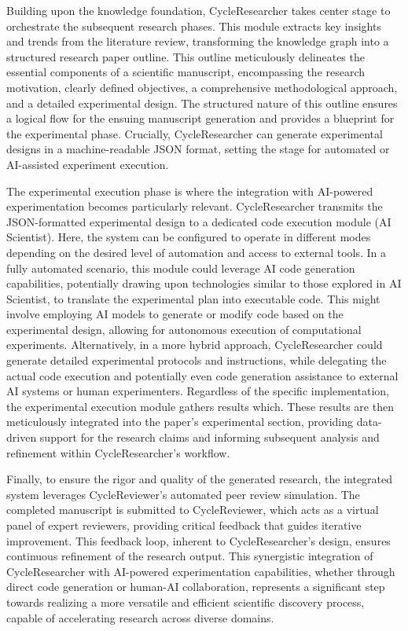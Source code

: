 \documentclass{article} %
\begin{document}
Building upon the knowledge foundation, CycleResearcher takes center stage to orchestrate the subsequent research phases. This module extracts key insights and trends from the literature review, transforming the knowledge graph into a structured research paper outline. This outline meticulously delineates the essential components of a scientific manuscript, encompassing the research motivation, clearly defined objectives, a comprehensive methodological approach, and a detailed experimental design. The structured nature of this outline ensures a logical flow for the ensuing manuscript generation and provides a blueprint for the experimental phase. Crucially, CycleResearcher can generate experimental designs in a machine-readable JSON format, setting the stage for automated or AI-assisted experiment execution.

The experimental execution phase is where the integration with AI-powered experimentation becomes particularly relevant. CycleResearcher transmits the JSON-formatted experimental design to a dedicated code execution module (AI Scientist). Here, the system can be configured to operate in different modes depending on the desired level of automation and access to external tools. In a fully automated scenario, this module could leverage AI code generation capabilities, potentially drawing upon technologies similar to those explored in AI Scientist, to translate the experimental plan into executable code. This might involve employing AI models to generate or modify code based on the experimental design, allowing for autonomous execution of computational experiments. Alternatively, in a more hybrid approach, CycleResearcher could generate detailed experimental protocols and instructions, while delegating the actual code execution and potentially even code generation assistance to external AI systems or human experimenters. Regardless of the specific implementation, the experimental execution module gathers results which. These results are then meticulously integrated into the paper's experimental section, providing data-driven support for the research claims and informing subsequent analysis and refinement within CycleResearcher's workflow.

Finally, to ensure the rigor and quality of the generated research, the integrated system leverages CycleReviewer's automated peer review simulation. The completed manuscript is submitted to CycleReviewer, which acts as a virtual panel of expert reviewers, providing critical feedback that guides iterative improvement. This feedback loop, inherent to CycleResearcher's design, ensures continuous refinement of the research output. This synergistic integration of CycleResearcher with AI-powered experimentation capabilities, whether through direct code generation or human-AI collaboration, represents a significant step towards realizing a more versatile and efficient scientific discovery process, capable of accelerating research across diverse domains.
\newpage
\end{document}
